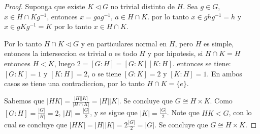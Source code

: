 \documentclass{article}
\theoremstyle{break}
\begin{document}
\begin{enumerate}
		\begin{proof}
Suponga que existe $K\triangleleft G$ no trivial  distinto de $H$. Sea $g\in G$, $x\in H\cap Kg^{-1}$, entonces $x=gag^{-1}$, $a\in H\cap K$. por lo tanto $x\in ghg^{-1}=h$ y $x\in gKg^{-1}=K$ por lo tanto $x\in H\cap K$.

Por lo tanto $H\cap K\triangleleft G$ y en particulares normal en $H$, pero $H$ es simple, entonces la interseccion es trivial o es todo $H$ y por hipotesis, si $H\cap K=H$ entonces $H<K$, luego $2=[G:H]=[G:K][K:H]$. entonces se tiene: $[G:K]=1$ y $[K:H]=2$, o se tiene $[G:K]=2$ y $[K:H]=1$. En ambos casos se tiene una contradiccion, por lo tanto $H\cap K=\{e\}$.

Sabemos que $|HK|=\frac{|H||K|}{|H\cap K|}=|H||K|$. Se concluye que $G\cong H\times K$. Como $[G:H]=\frac{|G|}{|H|}=2$, $|H|=\frac{|G|}{2}$, y se sigue que $|K|=\frac{|G|}{2}$. Note que $HK<G$, con lo cual se concluye que $|HK|=|H||K|=2\frac{|G|}{2}=|G|$. Se concluye que $G\cong H\times K$.
		\end{proof}

	\end{enumerate}
\end{document}
